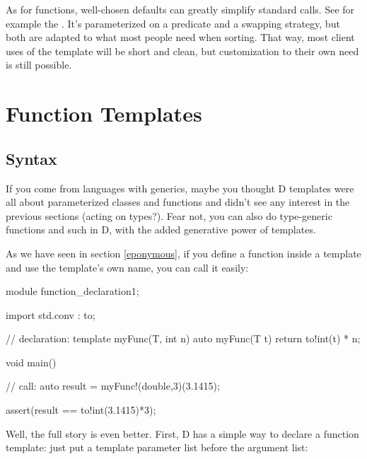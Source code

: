 
As for functions, well-chosen defaults can greatly simplify standard calls. See for example the . It's parameterized on a predicate and a swapping strategy, but both are adapted to what most people need when sorting. That way, most client uses of the template will be short and clean, but customization to their own need is still possible.



\section{Function Templates}\label{functiontemplates}

\subsection{Syntax}\label{functiontemplatessyntax}

If you come from languages with generics, maybe you thought D templates were all about parameterized classes and functions and didn't see any interest in the previous sections (acting on types?). Fear not, you can also do type-generic functions and such in D, with the added generative power of templates.

As we have seen in section \ref{eponymous}, if you define a function inside a template and use the template's own name, you can call it easily:

\begin{dcode}
module function_declaration1;

import std.conv : to;

// declaration:
template myFunc(T, int n)
{
    auto myFunc(T t) { return to!int(t) * n;}
}

void main()
{
    // call:
    auto result = myFunc!(double,3)(3.1415);

    assert(result == to!int(3.1415)*3);
}
\end{dcode}

Well, the full story is even better. First, D has a simple way to declare a function template: just put a template parameter list before the argument list:

